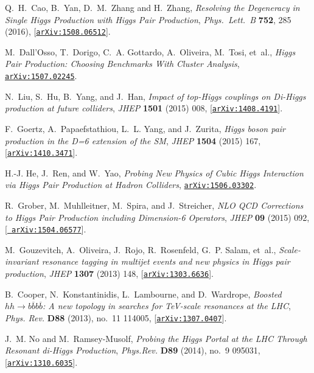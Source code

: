 \documentclass[a4paper,11pt]{article}
\begin{document}
\begin{thebibliography}{100}
  Q.~H.~Cao, B.~Yan, D.~M.~Zhang and H.~Zhang, 
  {\it Resolving the Degeneracy in Single Higgs Production with Higgs Pair Production}, 
  {\em Phys.\ Lett.\ B} {\bf 752}, 285 (2016),
  [\href{http://arxiv.org/abs/1508.06512}{{\tt arXiv:1508.06512}}].
  
M.~Dall'Osso, T.~Dorigo, C.~A. Gottardo, A.~Oliveira, M.~Tosi, et~al., {\it
  {Higgs Pair Production: Choosing Benchmarks With Cluster Analysis}},
  \href{http://arxiv.org/abs/1507.02245}{{\tt arXiv:1507.02245}}.

N.~Liu, S.~Hu, B.~Yang, and J.~Han, {\it {Impact of top-Higgs couplings on
  Di-Higgs production at future colliders}},  {\em JHEP} {\bf 1501} (2015) 008,
  [\href{http://arxiv.org/abs/1408.4191}{{\tt arXiv:1408.4191}}].

F.~Goertz, A.~Papaefstathiou, L.~L. Yang, and J.~Zurita, {\it {Higgs boson pair
  production in the D=6 extension of the SM}},  {\em JHEP} {\bf 1504} (2015)
  167, [\href{http://arxiv.org/abs/1410.3471}{{\tt arXiv:1410.3471}}].

H.-J. He, J.~Ren, and W.~Yao, {\it {Probing New Physics of Cubic Higgs
  Interaction via Higgs Pair Production at Hadron Colliders}},
  \href{http://arxiv.org/abs/1506.03302}{{\tt arXiv:1506.03302}}.

R.~Grober, M.~Muhlleitner, M.~Spira, and J.~Streicher, {\it {NLO QCD
  Corrections to Higgs Pair Production including Dimension-6 Operators}},  {\em
  JHEP} {\bf 09} (2015) 092, [\href{http://arxiv.org/abs/1504.06577}{{\tt
  arXiv:1504.06577}}].

M.~Gouzevitch, A.~Oliveira, J.~Rojo, R.~Rosenfeld, G.~P. Salam, et~al., {\it
  {Scale-invariant resonance tagging in multijet events and new physics in
  Higgs pair production}},  {\em JHEP} {\bf 1307} (2013) 148,
  [\href{http://arxiv.org/abs/1303.6636}{{\tt arXiv:1303.6636}}].

B.~Cooper, N.~Konstantinidis, L.~Lambourne, and D.~Wardrope, {\it {Boosted $hh
  → b\overline{b}b\overline{b}$: A new topology in searches for TeV-scale
  resonances at the LHC}},  {\em Phys. Rev.} {\bf D88} (2013), no.~11 114005,
  [\href{http://arxiv.org/abs/1307.0407}{{\tt arXiv:1307.0407}}].

J.~M. No and M.~Ramsey-Musolf, {\it {Probing the Higgs Portal at the LHC
  Through Resonant di-Higgs Production}},  {\em Phys.Rev.} {\bf D89} (2014),
  no.~9 095031, [\href{http://arxiv.org/abs/1310.6035}{{\tt arXiv:1310.6035}}].


\end{thebibliography}
\end{document}
